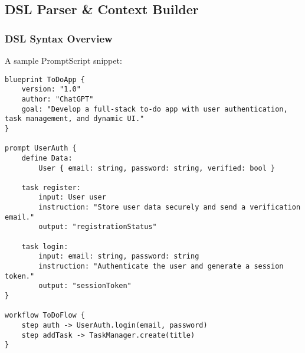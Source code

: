 \documentclass[11pt]{article}
\begin{document}
\subsection{DSL Parser \& Context Builder}

\subsubsection{DSL Syntax Overview}
A sample PromptScript snippet:
\begin{verbatim}
blueprint ToDoApp {
    version: "1.0"
    author: "ChatGPT"
    goal: "Develop a full-stack to-do app with user authentication, task management, and dynamic UI."
}

prompt UserAuth {
    define Data:
        User { email: string, password: string, verified: bool }
    
    task register:
        input: User user
        instruction: "Store user data securely and send a verification email."
        output: "registrationStatus"
    
    task login:
        input: email: string, password: string
        instruction: "Authenticate the user and generate a session token."
        output: "sessionToken"
}

workflow ToDoFlow {
    step auth -> UserAuth.login(email, password)
    step addTask -> TaskManager.create(title)
}
\end{verbatim}
\end{document}
